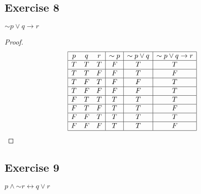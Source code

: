 \documentclass[14pt]{extarticle}
\newcommand{\bic}{\leftrightarrow}
\begin{document}
\subsection{Exercise 8}
${\sim p} \vee q \to r$

\begin{proof}
    $$
        \begin{array}{|ccc|c|c|c|}
            \hline
            p & q & r & {\sim p} & {\sim p} \vee q & {\sim p} \vee q \to r \\
            \hline
            T & T & T & F        & T               & T                     \\
            \hline
            T & T & F & F        & T               & F                     \\
            \hline
            T & F & T & F        & F               & T                     \\
            \hline
            T & F & F & F        & F               & T                     \\
            \hline
            F & T & T & T        & T               & T                     \\
            \hline
            F & T & F & T        & T               & F                     \\
            \hline
            F & F & T & T        & T               & T                     \\
            \hline
            F & F & F & T        & T               & F                     \\
            \hline
        \end{array}
    $$
\end{proof}

\subsection{Exercise 9}
$p \wedge {\sim r} \bic q \vee r$
\end{document}
